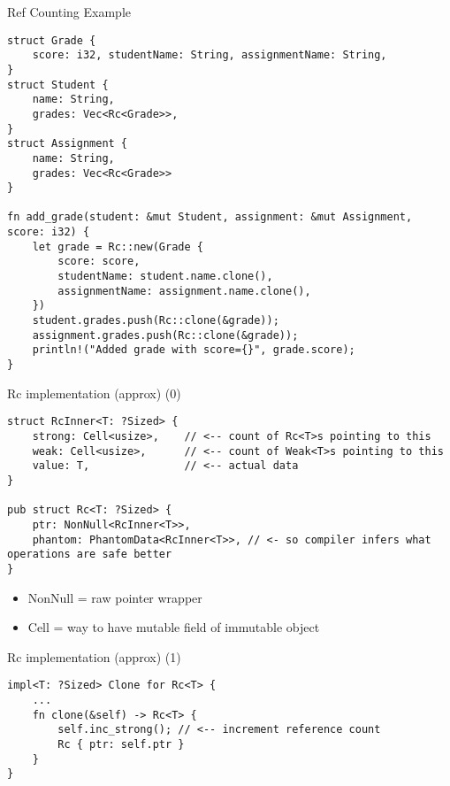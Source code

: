 \begin{frame}[fragile,label=refCountingEx]{Ref Counting Example}
\begin{verbatim}
struct Grade {
    score: i32, studentName: String, assignmentName: String,
}
struct Student {
    name: String,
    grades: Vec<Rc<Grade>>,
}
struct Assignment {
    name: String,
    grades: Vec<Rc<Grade>>
}

fn add_grade(student: &mut Student, assignment: &mut Assignment, score: i32) {
    let grade = Rc::new(Grade {
        score: score,
        studentName: student.name.clone(),
        assignmentName: assignment.name.clone(),
    })
    student.grades.push(Rc::clone(&grade));
    assignment.grades.push(Rc::clone(&grade));
    println!("Added grade with score={}", grade.score);
}
\end{verbatim}
\end{frame}


\begin{frame}[fragile,label=rcImplA]{Rc implementation (approx) (0)}
\begin{verbatim}
struct RcInner<T: ?Sized> {
    strong: Cell<usize>,    // <-- count of Rc<T>s pointing to this
    weak: Cell<usize>,      // <-- count of Weak<T>s pointing to this
    value: T,               // <-- actual data
}

pub struct Rc<T: ?Sized> {
    ptr: NonNull<RcInner<T>>,
    phantom: PhantomData<RcInner<T>>, // <- so compiler infers what operations are safe better
}
\end{verbatim}
\begin{itemize}
\item NonNull = raw pointer wrapper
\item Cell = way to have mutable field of immutable object
\end{itemize}
\end{frame}



\begin{frame}[fragile,label=rcImplA]{Rc implementation (approx) (1)}
\begin{verbatim}
impl<T: ?Sized> Clone for Rc<T> {
    ... 
    fn clone(&self) -> Rc<T> {
        self.inc_strong(); // <-- increment reference count
        Rc { ptr: self.ptr }
    }
}
\end{verbatim}
\end{frame}

